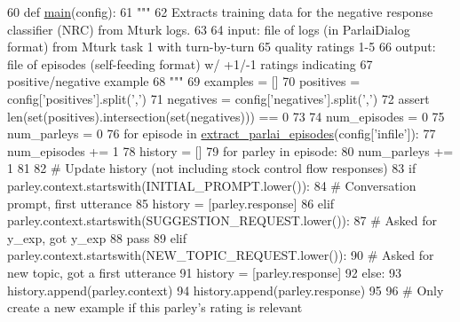 \begin{DoxyCode}
60 \textcolor{keyword}{def }\hyperlink{namespaceprojects_1_1self__feeding_1_1scripts_1_1convert__rated__to__polarized_abb1b1c7522da8d4703fc74cdb6422d87}{main}(config):
61     \textcolor{stringliteral}{"""}
62 \textcolor{stringliteral}{    Extracts training data for the negative response classifier (NRC) from Mturk logs.}
63 \textcolor{stringliteral}{}
64 \textcolor{stringliteral}{    input: file of logs (in ParlaiDialog format) from Mturk task 1 with turn-by-turn}
65 \textcolor{stringliteral}{        quality ratings 1-5}
66 \textcolor{stringliteral}{    output: file of episodes (self-feeding format) w/ +1/-1 ratings indicating}
67 \textcolor{stringliteral}{        positive/negative example}
68 \textcolor{stringliteral}{    """}
69     examples = []
70     positives = config[\textcolor{stringliteral}{'positives'}].split(\textcolor{stringliteral}{','})
71     negatives = config[\textcolor{stringliteral}{'negatives'}].split(\textcolor{stringliteral}{','})
72     \textcolor{keyword}{assert} len(set(positives).intersection(set(negatives))) == 0
73 
74     num\_episodes = 0
75     num\_parleys = 0
76     \textcolor{keywordflow}{for} episode \textcolor{keywordflow}{in} \hyperlink{namespaceprojects_1_1self__feeding_1_1utils_a7bfa2fe610a2d0da7968b1a2662e0c23}{extract\_parlai\_episodes}(config[\textcolor{stringliteral}{'infile'}]):
77         num\_episodes += 1
78         history = []
79         \textcolor{keywordflow}{for} parley \textcolor{keywordflow}{in} episode:
80             num\_parleys += 1
81 
82             \textcolor{comment}{# Update history (not including stock control flow responses)}
83             \textcolor{keywordflow}{if} parley.context.startswith(INITIAL\_PROMPT.lower()):
84                 \textcolor{comment}{# Conversation prompt, first utterance}
85                 history = [parley.response]
86             \textcolor{keywordflow}{elif} parley.context.startswith(SUGGESTION\_REQUEST.lower()):
87                 \textcolor{comment}{# Asked for y\_exp, got y\_exp}
88                 \textcolor{keywordflow}{pass}
89             \textcolor{keywordflow}{elif} parley.context.startswith(NEW\_TOPIC\_REQUEST.lower()):
90                 \textcolor{comment}{# Asked for new topic, got a first utterance}
91                 history = [parley.response]
92             \textcolor{keywordflow}{else}:
93                 history.append(parley.context)
94                 history.append(parley.response)
95 
96             \textcolor{comment}{# Only create a new example if this parley's rating is relevant}

\end{DoxyCode}
